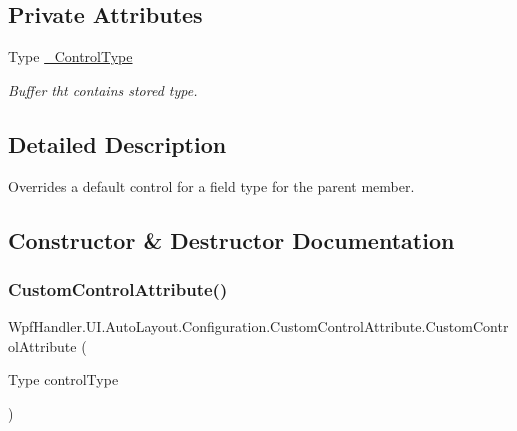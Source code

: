 \subsection*{Private Attributes}
\begin{DoxyCompactItemize}
\item 
Type \mbox{\hyperlink{class_wpf_handler_1_1_u_i_1_1_auto_layout_1_1_configuration_1_1_custom_control_attribute_a3099e2b45323143744f788f5f9db22ab}{\+\_\+\+Control\+Type}}
\begin{DoxyCompactList}\small\item\em Buffer tht contains stored type. \end{DoxyCompactList}\end{DoxyCompactItemize}


\subsection{Detailed Description}
Overrides a default control for a field type for the parent member. 



\subsection{Constructor \& Destructor Documentation}
\mbox{\label{class_wpf_handler_1_1_u_i_1_1_auto_layout_1_1_configuration_1_1_custom_control_attribute_a7a46691a6fae1c36fb9812923e90cf8a}} 
\subsubsection{\texorpdfstring{Custom\+Control\+Attribute()}{CustomControlAttribute()}}
{\footnotesize\ttfamily Wpf\+Handler.\+U\+I.\+Auto\+Layout.\+Configuration.\+Custom\+Control\+Attribute.\+Custom\+Control\+Attribute (\begin{DoxyParamCaption}\item[{Type}]{control\+Type }\end{DoxyParamCaption})}



